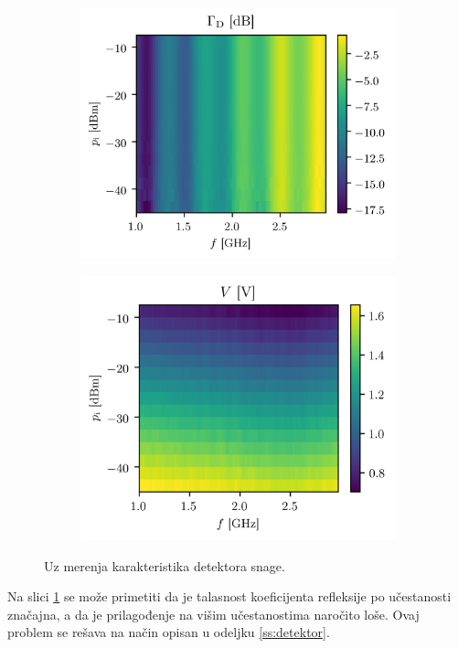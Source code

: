 \documentclass[a4paper, 12pt, diplomski]{etf}
\begin{document}
\begin{figure}[t!]
    \begin{subfigure}[b]{0.49\textwidth}
        \centering
        \includegraphics[width = 1\textwidth]{fig/S11_surf.png}
        \label{fig:gamma_surf}
    \end{subfigure}
    \hfill
    \begin{subfigure}[b]{0.49\textwidth}
        \centering
        \includegraphics[width = 1\textwidth]{fig/V_surf.png}
        \label{fig:V_surf}
    \end{subfigure}
    \caption{Uz merenja karakteristika detektora snage.}
\end{figure}
Na slici \ref{fig:gamma_surf} se može primetiti da je talasnost 
koeficijenta refleksije po učestanosti značajna, a da 
je prilagođenje na višim učestanostima naročito loše. Ovaj problem se rešava na način 
opisan u odeljku \ref{ss:detektor}.
\end{document}
